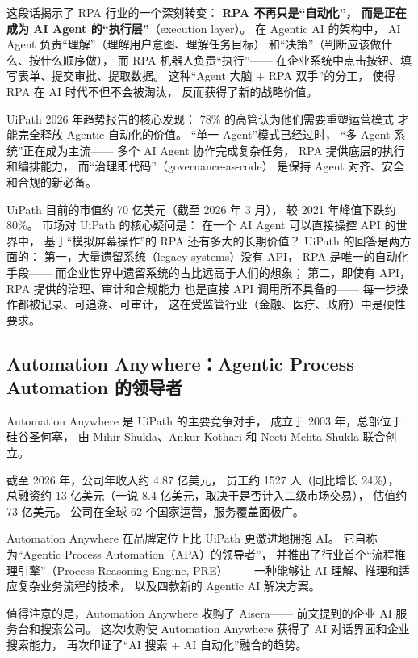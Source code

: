 这段话揭示了 RPA 行业的一个深刻转变：
\textbf{RPA 不再只是``自动化''，
而是正在成为 AI Agent 的``执行层''}（execution layer）。
在 Agentic AI 的架构中，
AI Agent 负责``理解''（理解用户意图、理解任务目标）
和``决策''（判断应该做什么、按什么顺序做），
而 RPA 机器人负责``执行''——
在企业系统中点击按钮、填写表单、提交审批、提取数据。
这种``Agent 大脑 + RPA 双手''的分工，
使得 RPA 在 AI 时代不但不会被淘汰，
反而获得了新的战略价值。

UiPath 2026 年趋势报告的核心发现：
78\% 的高管认为他们需要重塑运营模式
才能完全释放 Agentic 自动化的价值。
``单一 Agent''模式已经过时，
``多 Agent 系统''正在成为主流——
多个 AI Agent 协作完成复杂任务，
RPA 提供底层的执行和编排能力，
而``治理即代码''（governance-as-code）
是保持 Agent 对齐、安全和合规的新必备。

UiPath 目前的市值约 70 亿美元（截至 2026 年 3 月），
较 2021 年峰值下跌约 80\%。
市场对 UiPath 的核心疑问是：
在一个 AI Agent 可以直接操控 API 的世界中，
基于``模拟屏幕操作''的 RPA 还有多大的长期价值？
UiPath 的回答是两方面的：
第一，大量遗留系统（legacy systems）没有 API，
RPA 是唯一的自动化手段——
而企业世界中遗留系统的占比远高于人们的想象；
第二，即使有 API，RPA 提供的治理、审计和合规能力
也是直接 API 调用所不具备的——
每一步操作都被记录、可追溯、可审计，
这在受监管行业（金融、医疗、政府）中是硬性要求。

\subsection{Automation Anywhere：Agentic Process Automation 的领导者}

Automation Anywhere 是 UiPath 的主要竞争对手，
成立于 2003 年，总部位于硅谷圣何塞，
由 Mihir Shukla、Ankur Kothari 和 Neeti Mehta Shukla 联合创立。

截至 2026 年，公司年收入约 4.87 亿美元，
员工约 1527 人（同比增长 24\%），
总融资约 13 亿美元（一说 8.4 亿美元，取决于是否计入二级市场交易），
估值约 73 亿美元。
公司在全球 62 个国家运营，服务覆盖面极广。

Automation Anywhere 在品牌定位上比 UiPath 更激进地拥抱 AI。
它自称为``Agentic Process Automation（APA）的领导者''，
并推出了行业首个``流程推理引擎''（Process Reasoning Engine, PRE）——
一种能够让 AI 理解、推理和适应复杂业务流程的技术，
以及四款新的 Agentic AI 解决方案。

值得注意的是，Automation Anywhere 收购了 Aisera——
前文提到的企业 AI 服务台和搜索公司。
这次收购使 Automation Anywhere 获得了 AI 对话界面和企业搜索能力，
再次印证了``AI 搜索 + AI 自动化''融合的趋势。

